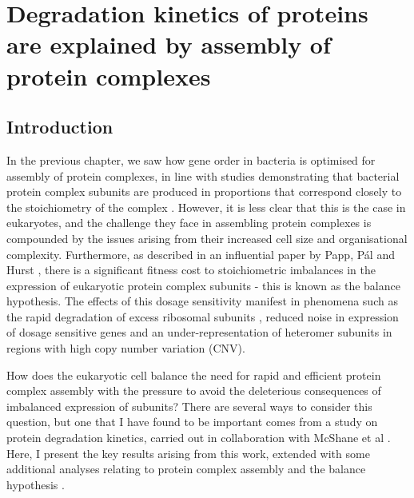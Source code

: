 \documentclass[a4paper,11pt,twoside,openright]{scrbook}
\begin{document}
\chapter{Degradation kinetics of proteins are explained by assembly of protein complexes}\label{chapter:degradation}

\section{Introduction}
In the previous chapter, we saw how gene order in bacteria is optimised for
assembly of protein complexes, in line with studies demonstrating that bacterial
protein complex subunits are produced in proportions that correspond closely to
the stoichiometry of the complex \cite{Li2014b,Burkhardt2017}. However, it is
less clear that this is the case in eukaryotes, and the challenge they face in
assembling protein complexes is compounded by the issues arising from their
increased cell size and organisational complexity. Furthermore, as described in
an influential paper by Papp, Pál and Hurst \cite{Papp2003}, there is a
significant fitness cost to stoichiometric imbalances in the expression of
eukaryotic protein complex subunits - this is known as the balance hypothesis.
The effects of this dosage sensitivity manifest in phenomena such as the rapid
degradation of excess ribosomal subunits \cite{Warner1999,Sung2016}, reduced
noise in expression of dosage sensitive genes \cite{Lehner2008} and an
under-representation of heteromer subunits in regions with high copy number
variation \cite{Schuster-Bockler2010} (CNV).

How does the eukaryotic cell balance the need for rapid and efficient protein
complex assembly with the pressure to avoid the deleterious consequences of
imbalanced expression of subunits? There are several ways to consider this
question, but one that I have found to be important comes from a study on
protein degradation kinetics, carried out in collaboration with McShane et al
\cite{McShane2016}. Here, I present the key results arising from this work,
extended with some additional analyses relating to protein complex assembly and
the balance hypothesis \cite{Papp2003}.
\end{document}
